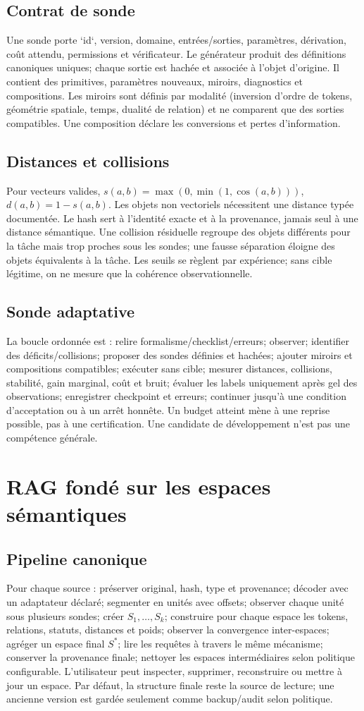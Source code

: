 \documentclass[11pt,a4paper]{report}
\begin{document}
\section{Contrat de sonde}Une sonde porte `id`, version, domaine, entrées/sorties, paramètres, dérivation, coût attendu, permissions et vérificateur. Le générateur produit des définitions canoniques uniques; chaque sortie est hachée et associée à l'objet d'origine. Il contient des primitives, paramètres nouveaux, miroirs, diagnostics et compositions. Les miroirs sont définis par modalité (inversion d'ordre de tokens, géométrie spatiale, temps, dualité de relation) et ne comparent que des sorties compatibles. Une composition déclare les conversions et pertes d'information.
\section{Distances et collisions}Pour vecteurs valides, $s(a,b)=\max(0,\min(1,\cos(a,b)))$, $d(a,b)=1-s(a,b)$. Les objets non vectoriels nécessitent une distance typée documentée. Le hash sert à l'identité exacte et à la provenance, jamais seul à une distance sémantique. Une collision résiduelle regroupe des objets différents pour la tâche mais trop proches sous les sondes; une fausse séparation éloigne des objets équivalents à la tâche. Les seuils se règlent par expérience; sans cible légitime, on ne mesure que la cohérence observationnelle.
\section{Sonde adaptative}La boucle ordonnée est : relire formalisme/checklist/erreurs; observer; identifier des déficits/collisions; proposer des sondes définies et hachées; ajouter miroirs et compositions compatibles; exécuter sans cible; mesurer distances, collisions, stabilité, gain marginal, coût et bruit; évaluer les labels uniquement après gel des observations; enregistrer checkpoint et erreurs; continuer jusqu'à une condition d'acceptation ou à un arrêt honnête. Un budget atteint mène à une reprise possible, pas à une certification. Une candidate de développement n'est pas une compétence générale.

\chapter{RAG fondé sur les espaces sémantiques}
\section{Pipeline canonique}Pour chaque source : préserver original, hash, type et provenance; décoder avec un adaptateur déclaré; segmenter en unités avec offsets; observer chaque unité sous plusieurs sondes; créer $S_1,\ldots,S_k$; construire pour chaque espace les tokens, relations, statuts, distances et poids; observer la convergence inter-espaces; agréger un espace final $S^*$; lire les requêtes à travers le même mécanisme; conserver la provenance finale; nettoyer les espaces intermédiaires selon politique configurable. L'utilisateur peut inspecter, supprimer, reconstruire ou mettre à jour un espace. Par défaut, la structure finale reste la source de lecture; une ancienne version est gardée seulement comme backup/audit selon politique.
\end{document}

